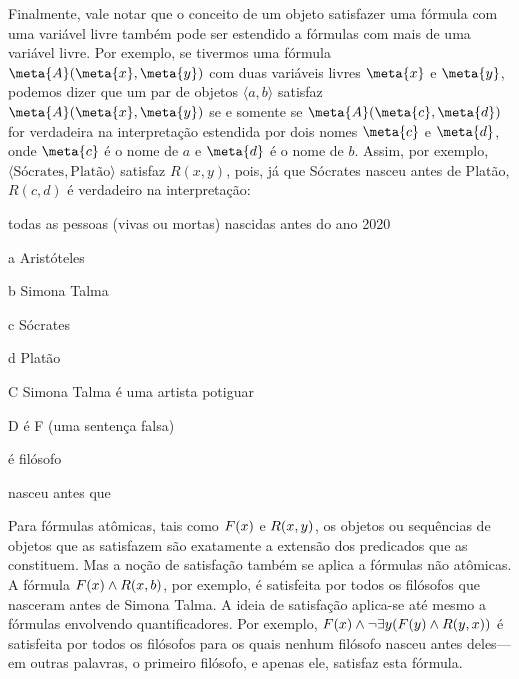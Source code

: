Finalmente, vale notar que o conceito de um objeto satisfazer uma fórmula com uma variável livre também pode ser estendido a fórmulas com mais de uma variável livre.
Por exemplo, se tivermos uma fórmula $\meta{A}(\meta{x},\meta{y})$ com duas variáveis livres $\meta{x}$ e $\meta{y}$, podemos dizer que um par de objetos $\langle a, b\rangle$ satisfaz $\meta{A}(\meta{x},\meta{y})$ se e somente se $\meta{A}(\meta{c},\meta{d})$ for verdadeira na interpretação estendida por dois nomes $\meta{c}$ e $\meta{d}$, onde $\meta{c}$ é o nome de $a$ e $\meta{d}$ é o nome de $b$.
Assim, por exemplo, $\langle \text{Sócrates}, \text{Platão}\rangle$ satisfaz $R(x,y)$, pois, já que Sócrates nasceu antes de Platão, $R(c,d)$ é verdadeiro na interpretação:
\begin{center}
	\begin{ekey}
		\item[\text{domínio}] {\footnotesize todas as pessoas (vivas ou mortas) nascidas antes do ano 2020}
		\item[a] {\small Aristóteles}
		\item[b] {\small Simona Talma}
		\item[c] {\small Sócrates}
		\item[d] {\small Platão}
		\item[C] {\small Simona Talma é uma artista potiguar\,}
		\item[D] {\small é F (uma sentença falsa)}
		\item[\atom{F}{x}]  {\small é filósofo}
		\item[\atom{R}{x,y}]  {\small nasceu antes que} 
	\end{ekey}
\end{center}
Para fórmulas atômicas, tais como $\mathord{F}(x)$ e $\mathord{R}(x,y)$,  os objetos ou sequências de objetos que as satisfazem são exatamente a extensão dos predicados que as constituem.
Mas a noção de satisfação também se aplica a fórmulas não atômicas.
A fórmula $\mathord{F}(x) \land \mathord{R}(x,b)$, por exemplo, é satisfeita por todos os filósofos que nasceram antes de Simona Talma.
A ideia de satisfação aplica-se até mesmo a fórmulas envolvendo quantificadores.
Por exemplo, $F(x) \wedge \lnot\exists y(F(y) \land R(y,x))$ é satisfeita por todos os filósofos para os quais nenhum filósofo nasceu antes deles---em outras palavras, o primeiro filósofo, e apenas ele, satisfaz esta fórmula.


